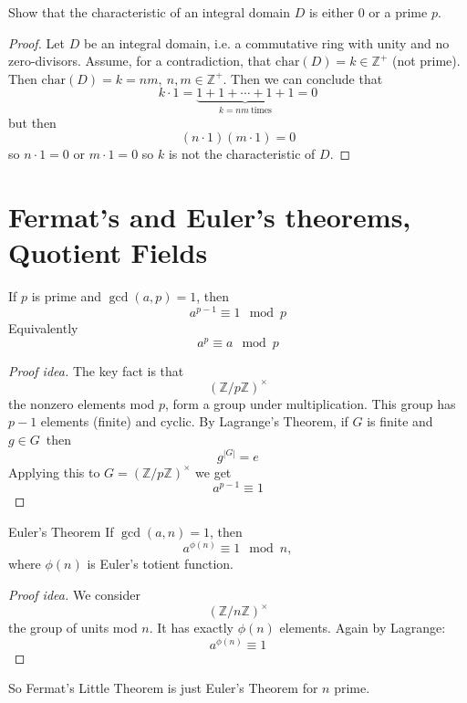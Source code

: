 \begin{prob}
    Show that the characteristic of an integral domain $D$ is either 
    $0$ or a prime $p$. 
\end{prob}
\begin{proof}
    Let $D$ be an integral domain, i.e. a commutative ring 
    with unity and no zero-divisors. 
    Assume, for a contradiction, that 
    $\text{char}(D) = k \in \mathbb Z^+$ (not prime). 
    Then $\text{char}(D) = k = nm, \: n,m \in \mathbb Z^+$.
    Then we can conclude that 
    \[
        k\cdot 1 = \underbrace{1+1+\cdots+1+1}_{k=nm \ \text{times}} 
        = 0
    \]
    but then 
    \[
        (n\cdot 1)(m\cdot 1) = 0
    \]
    so $n\cdot 1 = 0$ or $m\cdot1=0$ so $k$ is not the characteristic
    of $D$. 
\end{proof}

\newpage 
\section{Fermat's and Euler's theorems, Quotient Fields}
\begin{thm}
    If $p$ is prime and $\gcd(a,p) = 1$, then 
    \[
        a^{p-1} \equiv 1 \mod p
    \]
    Equivalently 
    \[
        a^p \equiv a \mod p
    \]
\end{thm}
\begin{proof}[Proof idea]
    The key fact is that 
    \[
        (\mathbb Z/p\mathbb Z)^\times
    \]
    the nonzero elements mod $p$, form a group under multiplication.
    This group has $p-1$ elements (finite) and cyclic. By 
    Lagrange's Theorem, if $G$ is finite and $g\in G$ then 
    \[
        g^{|G|} = e
    \]
    Applying this to $G = (\mathbb Z/p\mathbb Z)^\times$ we get 
    \[
        a^{p-1} \equiv 1
    \]
\end{proof}

\begin{thm}{Euler's Theorem}
    If $\gcd(a,n)=1$, then 
    \[
        a^{\phi(n)} \equiv 1 \mod n,
    \]
    where $\phi(n)$ is Euler's totient function.
\end{thm}
\begin{proof}[Proof idea]
    We consider 
    \[
        (\mathbb Z/n\mathbb Z)^\times
    \]
    the group of units mod $n$. 
    It has exactly $\phi(n)$ elements. 
    Again by Lagrange: 
    \[
        a^{\phi(n)} \equiv 1 
    \]
\end{proof}
So Fermat's Little Theorem is just Euler's Theorem for $n$ prime. 

